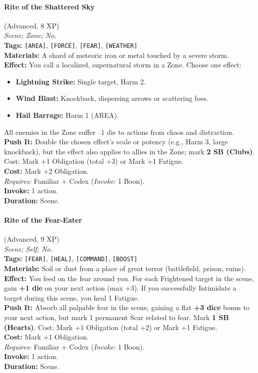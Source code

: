 \paragraph{Rite of the Shattered Sky} (Advanced, 8 XP) \hfill \\
\emph{Scene; Zone; No.} \\
\textbf{Tags:} \texttt{[AREA]}, \texttt{[FORCE]}, \texttt{[FEAR]}, \texttt{[WEATHER]} \\
\textbf{Materials:} A shard of meteoric iron or metal touched by a severe storm. \\
\textbf{Effect:} You call a localized, supernatural storm in a Zone. Choose one effect:
\begin{itemize}
  \item \textbf{Lightning Strike:} Single target, Harm 2.
  \item \textbf{Wind Blast:} Knockback, dispersing arrows or scattering foes.
  \item \textbf{Hail Barrage:} Harm 1 (AREA).
\end{itemize}
All enemies in the Zone suffer --1 die to actions from chaos and distraction. \\
\textbf{Push It:} Double the chosen effect's scale or potency (e.g., Harm 3, large knockback), but the effect also applies to allies in the Zone; mark \textbf{2 SB (Clubs)}. Cost: Mark +1 Obligation (total +3) or Mark +1 Fatigue. \\
\textbf{Cost:} Mark +2 Obligation. \\
\textit{Requires:} Familiar + Codex (\textit{Invoke:} 1 Boon). \\
\textbf{Invoke:} 1 action. \\
\textbf{Duration:} Scene.

\paragraph{Rite of the Fear-Eater} (Advanced, 9 XP) \hfill \\
\emph{Scene; Self; No.} \\
\textbf{Tags:} \texttt{[FEAR]}, \texttt{[HEAL]}, \texttt{[COMMAND]}, \texttt{[BOOST]} \\
\textbf{Materials:} Soil or dust from a place of great terror (battlefield, prison, ruins). \\
\textbf{Effect:} You feed on the fear around you. For each Frightened target in the scene, gain \textbf{+1 die} on your next action (max +3). If you successfully Intimidate a target during this scene, you heal 1 Fatigue. \\
\textbf{Push It:} Absorb all palpable fear in the scene, gaining a flat \textbf{+3 dice} bonus to your next action, but mark 1 permanent Scar related to fear. Mark \textbf{1 SB (Hearts)}. Cost: Mark +1 Obligation (total +2) or Mark +1 Fatigue. \\
\textbf{Cost:} Mark +1 Obligation. \\
\textit{Requires:} Familiar + Codex (\textit{Invoke:} 1 Boon). \\
\textbf{Invoke:} 1 action. \\
\textbf{Duration:} Scene.

